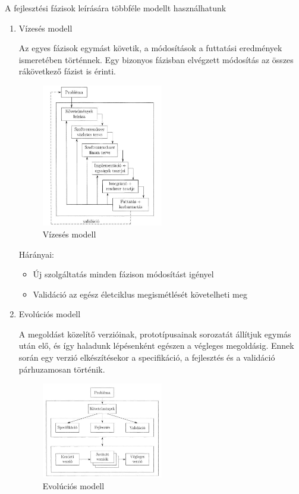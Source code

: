 \documentclass[margin=0px]{article}
\begin{document}
		A fejlesztési fázisok leírására többféle modellt használhatunk
		\begin{enumerate}
			\item Vízesés modell
			
				Az egyes fázisok egymást követik, a
				módosítások a futtatási eredmények ismeretében történnek. Egy bizonyos
				fázisban elvégzett módosítás az összes rákövetkező fázist is érinti.
				
				\begin{figure}[H]
					\centering
					\includegraphics[width=0.5\textwidth]{img/vizeses.png}
					\caption{Vízesés modell}
					\label{fig:vizeses}
				\end{figure}
				
				Hárányai: 
					\begin{itemize}
						\item Új szolgáltatás minden fázison módosítást igényel
						\item Validáció az egész életciklus megismétlését követelheti meg
					\end{itemize}
			\item Evolúciós modell
			
				A megoldást közelítő verzióinak, prototípusainak sorozatát
				állítjuk egymás után elő, és így haladunk lépésenként egészen a végleges
				megoldásig. Ennek során egy verzió elkészítésekor a specifikáció, a fejlesztés és a validáció párhuzamosan történik.
				
				\begin{figure}[H]
					\centering
					\includegraphics[width=0.5\textwidth]{img/evolucios.png}
					\caption{Evolúciós modell}
					\label{fig:evolucios}
				\end{figure}
				

\end{enumerate}
\end{document}
